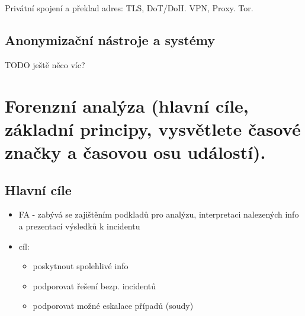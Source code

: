 Privátní spojení a překlad adres: TLS, DoT/DoH.
VPN, Proxy.
Tor.


\subsection{Anonymizační nástroje a systémy}

TODO ještě něco víc?




\clearpage
\section{Forenzní analýza (hlavní cíle, základní principy, vysvětlete časové značky a časovou osu událostí).}
\subsection{Hlavní cíle}
\begin{itemize}
    \item FA - zabývá se zajištěním podkladů pro analýzu, interpretaci nalezených info a prezentací výsledků k incidentu
    \item cíl:
    \begin{itemize}
        \item poskytnout spolehlivé info
        \item podporovat řešení bezp. incidentů
        \item podporovat možné eskalace případů (soudy)
    \end{itemize}
\end{itemize}

